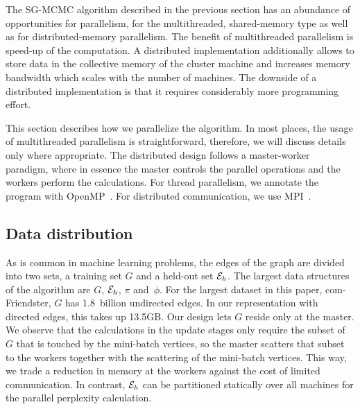 \begin{comment}
- pi storage: DKV
   . pi/phi is read in 3), 4), 5a), 7)
   . pi is written in 4); read[i], then write[i], so no other data dependencies
   . so access is very synchronous: either read-only, or write without
     concurrent readers
   . DKV store properties:
      - single-sized keys
      - contiguous key space (integers 0..N-1)
      - update-only writes: no new KVs, no deletes
     so: no load imbalance, no hashing that is worth its name
      - no read/write or write/write concurrency
     so:
      - build RDMA store with remote reads and remote writes only, with exactly
        one RDMA transaction per read or write
\end{comment}



The SG-MCMC algorithm described in the previous section has an abundance of
opportunities for parallelism, for the multithreaded, shared-memory type as
well as for distributed-memory parallelism. The benefit of multithreaded
parallelism is speed-up of the computation. A distributed implementation
additionally allows to store data in the collective memory of the cluster
machine and increases memory bandwidth which scales with the number of
machines. The downside of a distributed implementation is that it requires
considerably more programming effort.


This section describes how we parallelize the algorithm.
In most places, the usage of multithreaded parallelism
is straightforward, therefore, we will discuss details only where appropriate. The
distributed design follows a master-worker paradigm, where in essence
the master controls the parallel operations and the workers perform the
calculations. For thread parallelism, we annotate the program with
OpenMP~\cite{OpenMPSpec}. For distributed communication, we use
MPI~\cite{Forum:1994:MMI:898758}.


\subsection{Data distribution}

As is common in machine learning problems, the edges of the graph are divided
into two sets, a training set $G$ and a held-out set $\cE_h$.
The largest data structures of the algorithm are $G$, $\cE_h$, $\pi$ and~$\phi$.
For the largest dataset in this paper, com-Friendster, $G$ has 1.8~billion
undirected edges. In our representation with directed edges, this takes
up 13.5GB. Our design lets $G$ reside only at the master. We observe that
the calculations in the update stages only require the subset of $G$ that
is touched by the mini-batch vertices, so the master scatters that subset to
the workers together with the scattering of the mini-batch vertices. This way,
we trade a reduction in memory at the workers against the cost of limited
communication. In contrast, $\cE_h$ can be partitioned statically over all
machines for the parallel perplexity calculation.

